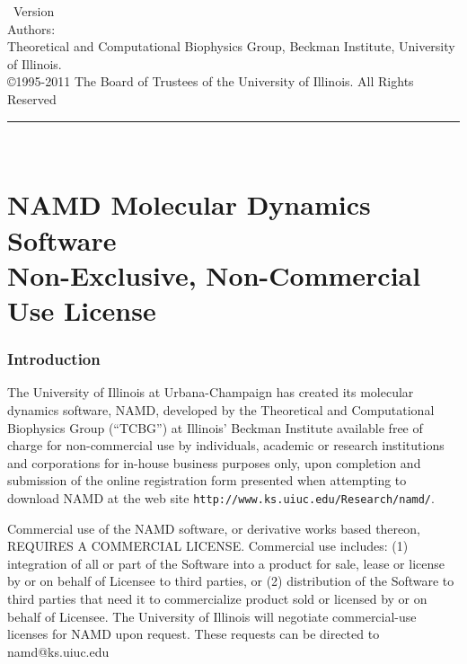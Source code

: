 
\thispagestyle{empty}

\vspace*{0.1in}

\begin{centering}
{\LARGE \NAMD\ Version \NAMDVER}\\
\bigskip
{\large Authors: \NAMDAUTHORS} \\
\medskip
{\large Theoretical and Computational Biophysics Group, Beckman Institute, University of Illinois.} \\
\bigskip
{\large \copyright 1995-2011 The Board of Trustees of the University of Illinois.
All Rights Reserved} \\
\bigskip
\end{centering}

  \rule{6in}{0.04in}				\\	\vspace{0.25in}

\section*{NAMD Molecular Dynamics Software \\
Non-Exclusive, Non-Commercial Use License}

\subsubsection*{Introduction}

The University of Illinois at Urbana-Champaign has created its molecular
dynamics software, NAMD, developed by the Theoretical and Computational Biophysics 
Group (``TCBG'') at Illinois' Beckman Institute available free of charge for
non-commercial use by individuals, academic or research institutions and
corporations for in-house business purposes only, upon completion and
submission of the online registration form presented when attempting to
download NAMD at the web site {\tt http://www.ks.uiuc.edu/Research/namd/}.

Commercial use of the NAMD software, or derivative works based thereon,
REQUIRES A COMMERCIAL LICENSE. Commercial use includes: 
(1) integration of all or part of the Software into a product for sale, 
lease or license by or on behalf of Licensee to third parties, or 
(2) distribution of the Software to third parties that need it to 
commercialize product sold or licensed by or on behalf of Licensee.  
The University of Illinois will negotiate commercial-use licenses for 
NAMD upon request. These requests can be directed to namd@ks.uiuc.edu

